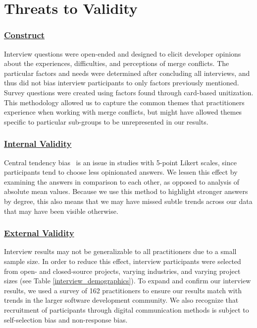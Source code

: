 \section{Threats to Validity}\label{threats}
\subsubsection{\underline{Construct}}
Interview questions were open-ended and designed to elicit developer opinions about the experiences, difficulties, and perceptions of merge conflicts.
The particular factors and needs were determined after concluding all interviews, and thus did not bias interview participants to only factors previously mentioned.
Survey questions were created using factors found through card-based unitization.
This methodology allowed us to capture the common themes that practitioners experience when working with merge conflicts, but might have allowed themes specific to particular sub-groups to be unrepresented in our results.
\subsubsection{\underline{Internal Validity}}
Central tendency bias~\cite{guilford1954psychometric} is an issue in studies with 5-point Likert scales, since participants tend to choose less opinionated answers.
We lessen this effect by examining the answers in comparison to each other, as opposed to analysis of absolute mean values.
Because we use this method to highlight stronger answers by degree, this also means that we may have missed subtle trends across our data that may have been visible otherwise.

\subsubsection{\underline{External Validity}}
Interview results may not be generalizable to all practitioners due to a small sample size.
In order to reduce this effect, interview participants were selected from open- and closed-source projects, varying industries, and varying project sizes (see Table \ref{interview_demographics}).
To expand and confirm our interview results, we used a survey of 162 practitioners to ensure our results match with trends in the larger software development community.
We also recognize that recruitment of participants through digital communication methods is subject to self-selection bias and non-response bias.

